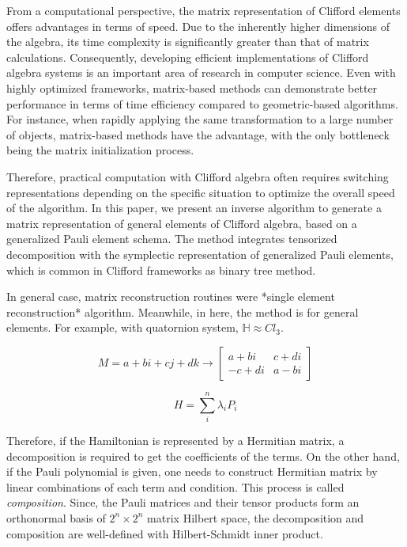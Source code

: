 \documentclass[twocolumn]{article}
\begin{document}
From a computational perspective, the matrix representation of Clifford elements offers 
advantages in terms of speed. Due to the inherently higher dimensions of the algebra, its time
 complexity is significantly greater than that of matrix calculations. Consequently, developing
efficient implementations of Clifford algebra systems is an important area of research in 
computer science. Even with highly optimized frameworks, matrix-based methods can demonstrate 
better performance in terms of time efficiency compared to geometric-based algorithms. 
For instance, when rapidly applying the same transformation to a large number of objects,
matrix-based methods have the advantage, with the only bottleneck being the matrix 
initialization process.


Therefore, practical computation with Clifford algebra often requires switching representations depending on the specific situation to optimize the overall speed of the algorithm. 
In this paper, we present an inverse algorithm to generate a matrix representation of general elements of Clifford algebra, based on a generalized Pauli element schema. 
The method integrates tensorized decomposition with the symplectic representation of generalized Pauli elements, which is common in Clifford frameworks as binary tree method.

In general case, matrix reconstruction routines 
were *single element reconstruction* algorithm.
Meanwhile, in here, the method is for general elements.
For example, with quatornion system, $\mathbb{H} \approx Cl_3$.

$$M = a + bi + cj + dk \rightarrow  
\begin{bmatrix} 
a + b i & c+ di\\
-c + di & a- bi
\end{bmatrix}
$$



\begin{equation}
    H = \sum_i^n \lambda_i P_i
\end{equation}

Therefore, if the Hamiltonian is represented by a Hermitian matrix, 
a decomposition is required to get the coefficients of the terms. 
On the other hand, if the Pauli polynomial is given, 
one needs to construct Hermitian matrix by linear combinations of each term and condition.
This process is called \textit{composition}.
Since, the Pauli matrices and their tensor products form an orthonormal basis 
of $2^n \times 2^n$ matrix Hilbert space\cite{nielsen2010quantum}, 
the decomposition and composition are well-defined with Hilbert-Schmidt inner product. 
\end{document}
